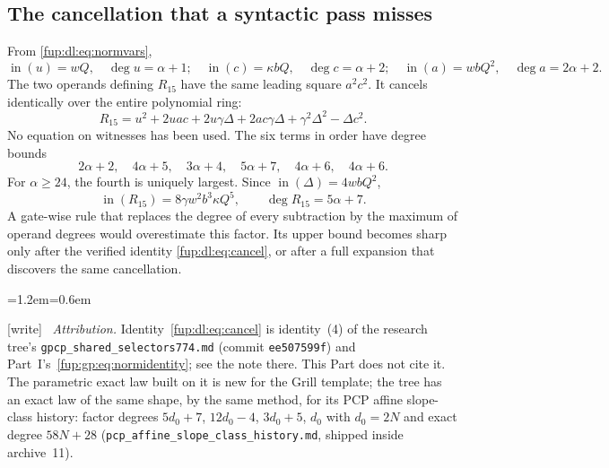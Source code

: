 \documentclass[11pt,letterpaper]{article}
\theoremstyle{definition}\newtheorem{definition}[theorem]{Definition}
\theoremstyle{remark}\newtheorem{remark}[theorem]{Remark}
\newcommand{\topf}[1]{\operatorname{in}(#1)}
\newcommand{\wtag}{\textup{[write]}}
\newenvironment{writenote}{\par\smallskip\begin{list}{}{\leftmargin=1.2em\rightmargin=0.6em}\item[]\small\wtag\ }{\end{list}\smallskip}
\newcommand{\rw}[1]{\nolinkurl{#1}}%
\begin{document}
\subsection{The cancellation that a syntactic pass misses}
From \eqref{fup:dl:eq:normvars},
\[
 \topf{u}=wQ,\quad \deg u=\alpha+1;
 \quad\topf{c}=\kappa bQ,\quad\deg c=\alpha+2;
 \quad\topf{a}=wbQ^2,\quad\deg a=2\alpha+2.
\]
The two operands defining $R_{15}$ have the same leading square $a^2c^2$. It cancels identically over the entire polynomial ring:
\begin{equation}\label{fup:dl:eq:cancel}
 R_{15}=u^2+2uac+2u\gamma\Delta+2ac\gamma\Delta
             +\gamma^2\Delta^2-\Delta c^2.
\end{equation}
No equation on witnesses has been used. The six terms in order have degree bounds
\[
 2\alpha+2,\quad4\alpha+5,\quad3\alpha+4,
 \quad5\alpha+7,\quad4\alpha+6,\quad4\alpha+6.
\]
For $\alpha\ge24$, the fourth is uniquely largest. Since $\topf{\Delta}=4wbQ^2$,
\begin{equation}\label{fup:dl:eq:R15top}
 \topf{R_{15}}=8\gamma w^2b^3\kappa Q^5,
 \qquad\deg R_{15}=5\alpha+7.
\end{equation}
A gate-wise rule that replaces the degree of every subtraction by the maximum of operand degrees would overestimate this factor. Its upper bound becomes sharp only after the verified identity \eqref{fup:dl:eq:cancel}, or after a full expansion that discovers the same cancellation.
\begin{writenote}
\emph{Attribution.} Identity~\eqref{fup:dl:eq:cancel} is identity~(4) of the research tree's \rw{gpcp_shared_selectors774.md} (commit \texttt{ee507599f}) and Part~I's~\eqref{fup:gp:eq:normidentity}; see the note there. This Part does not cite it. The parametric exact law built on it is new for the Grill template; the tree has an exact law of the same shape, by the same method, for its PCP affine slope-class history: factor degrees $5d_0+7$, $12d_0-4$, $3d_0+5$, $d_0$ with $d_0=2N$ and exact degree $58N+28$ (\rw{pcp_affine_slope_class_history.md}, shipped inside archive~11).
\end{writenote}
\end{document}
